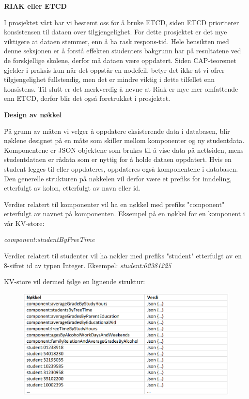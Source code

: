\textbf{RIAK eller ETCD}

I prosjektet vårt har vi bestemt oss for å bruke ETCD, siden ETCD prioriterer konsistensen til dataen over tilgjengelighet. For dette prosjektet er det mye viktigere at dataen stemmer, enn å ha rask respons-tid. Hele hensikten med denne seksjonen er å forstå effekten studenters bakgrunn har på resultatene ved de forskjellige skolene, derfor må dataen være oppdatert. Siden CAP-teoremet gjelder i praksis kun når det oppstår en nodefeil, betyr det ikke at vi ofrer tilgjengelighet fullstendig, men det er mindre viktig i dette tilfellet enn konsistens. Til slutt er det merkverdig å nevne at Riak er mye mer omfattende enn ETCD, derfor blir det også foretrukket i prosjektet.


\textbf{Design av nøkkel}

På grunn av måten vi velger å oppdatere eksisterende data i databasen, blir nøklene designet på en måte som skiller mellom komponenter og ny studentdata. Komponentene er JSON-objektene som brukes til å vise data på nettsiden, mens studentdataen er rådata som er nyttig for å holde dataen oppdatert. Hvis en student legges til eller oppdateres, oppdateres også komponentene i databasen. Den generelle strukturen på nøkkelen vil derfor være et prefiks for inndeling, etterfulgt av kolon, etterfulgt av navn eller id.

Verdier relatert til komponenter vil ha en nøkkel med prefiks "component" etterfulgt av navnet på komponenten. Eksempel på en nøkkel for en komponent i vår KV-store:

  \textit{component:studentByFreeTime}

Verdier relatert til studenter vil ha nøkler med prefiks "student" etterfulgt av en 8-sifret id av typen Integer. Eksempel:
\textit{student:02381225}

KV-store vil dermed følge en lignende struktur:

\FigureCounter
\begin{figure}[H]
  \includegraphics[width=\textwidth]{images/milepael2/tabellKVStore.png}
\end{figure}


